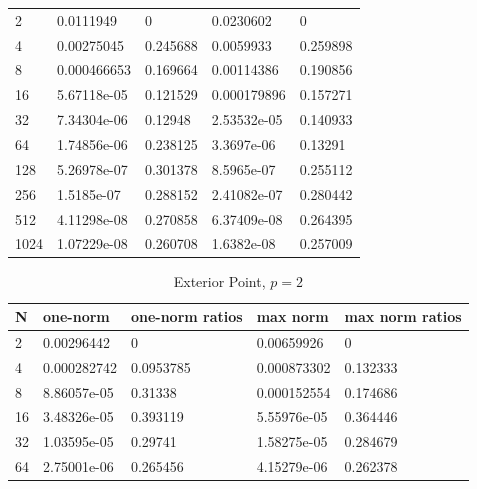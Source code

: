 \documentclass{article} %
\theoremstyle{plain}
\numberwithin{equation}{section} %
\numberwithin{figure}{section} %
\numberwithin{table}{section} %
\begin{document}
\begin{enumerate}[\ \ (a)]
\begin{table}
\begin{tabular}[ht!]{lllll}
                \hline
                    2 & 0.0111949   &          0        & 0.0230602   &          0        \\
                    4 & 0.00275045  &          0.245688 & 0.0059933   &          0.259898 \\
                    8 & 0.000466653 &          0.169664 & 0.00114386  &          0.190856 \\
                   16 & 5.67118e-05 &          0.121529 & 0.000179896 &          0.157271 \\
                   32 & 7.34304e-06 &          0.12948  & 2.53532e-05 &          0.140933 \\
                   64 & 1.74856e-06 &          0.238125 & 3.3697e-06  &          0.13291  \\
                  128 & 5.26978e-07 &          0.301378 & 8.5965e-07  &          0.255112 \\
                  256 & 1.5185e-07  &          0.288152 & 2.41082e-07 &          0.280442 \\
                  512 & 4.11298e-08 &          0.270858 & 6.37409e-08 &          0.264395 \\
                 1024 & 1.07229e-08 &          0.260708 & 1.6382e-08  &          0.257009 \\
                \hline
            \end{tabular}
        \end{table}
        \begin{table}
            \centering
            \caption{Exterior Point, $p=2$}
            \begin{tabular}[ht!]{lllll}
                \hline
                    N &    one-norm &   one-norm ratios &    max norm &   max norm ratios \\
                \hline
                    2 & 0.00296442  &         0         & 0.00659926  &          0        \\
                    4 & 0.000282742 &         0.0953785 & 0.000873302 &          0.132333 \\
                    8 & 8.86057e-05 &         0.31338   & 0.000152554 &          0.174686 \\
                   16 & 3.48326e-05 &         0.393119  & 5.55976e-05 &          0.364446 \\
                   32 & 1.03595e-05 &         0.29741   & 1.58275e-05 &          0.284679 \\
                   64 & 2.75001e-06 &         0.265456  & 4.15279e-06 &          0.262378 \\

\end{tabular}
\end{table}
\end{enumerate}
\end{document}
